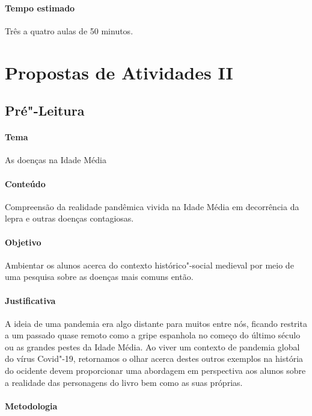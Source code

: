 \documentclass[12pt]{extarticle}
\begin{document}
 \paragraph{Tempo estimado} Três a quatro aulas de 50 minutos. 


\section{Propostas de Atividades II}

\subsection{Pré"-Leitura}

 \paragraph{Tema} As doenças na Idade Média

 \paragraph{Conteúdo} Compreensão da realidade pandêmica vivida na Idade
 Média em decorrência da lepra e outras doenças contagiosas.

 \paragraph{Objetivo} Ambientar os alunos acerca do contexto histórico"-social 
 medieval por meio de uma pesquisa sobre as doenças mais comuns então.

 \paragraph{Justificativa} A ideia de uma pandemia era algo distante para
 muitos entre nós, ficando restrita a um passado quase remoto como a gripe
 espanhola no começo do último século ou as grandes pestes da Idade Média. 
 Ao viver um contexto de pandemia global do vírus Covid"-19, retornamos o
 olhar acerca destes outros exemplos na história do ocidente devem proporcionar 
 uma abordagem em perspectiva aos alunos sobre a realidade das personagens 
 do livro bem como as suas próprias.

 \paragraph{Metodologia}
 	
\end{document}
